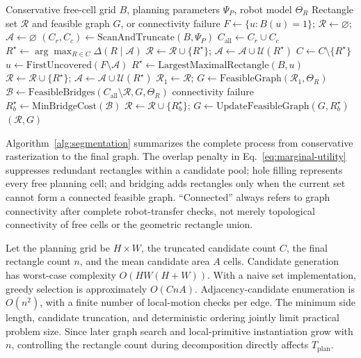 \begin{algorithm}[H]
\caption{Rectangle segmentation and connectivity completion}
\label{alg:segmentation}
\small
\begin{algorithmic}[1]
\Require Conservative free-cell grid $B$, planning parameters $\Psi_P$, robot model $\Theta_R$
\Ensure Rectangle set $\mathcal R$ and feasible graph $G$, or connectivity failure
\State $F\gets\{u:B(u)=1\}$; $\mathcal R\gets\varnothing$; $\mathcal A\gets\varnothing$
\State $(C_r,C_c)\gets\mathrm{ScanAndTruncate}(B,\Psi_P)$
\State $C_{\mathrm{all}}\gets C_r\cup C_c$
    \State $R^\star\gets\arg\max_{R\in C}\Delta(R\mid\mathcal A)$ 
    \State $\mathcal R\gets\mathcal R\cup\{R^\star\}$; $\mathcal A\gets\mathcal A\cup\mathcal U(R^\star)$
    \State $C\gets C\setminus\{R^\star\}$
  \EndWhile
\EndFor
{}
  \State $u\gets\mathrm{FirstUncovered}(F\setminus\mathcal A)$
  \State $R^\star\gets\mathrm{LargestMaximalRectangle}(B,u)$ 
  \State $\mathcal R\gets\mathcal R\cup\{R^\star\}$; $\mathcal A\gets\mathcal A\cup\mathcal U(R^\star)$
\EndWhile
\State $\mathcal R_1\gets\mathcal R$; $G\gets\mathrm{FeasibleGraph}(\mathcal R_1,\Theta_R)$
  \State $\mathcal B\gets\mathrm{FeasibleBridges}(C_{\mathrm{all}}\setminus\mathcal R,G,\Theta_R)$
    \State \Return connectivity failure
  \EndIf
  \State $R_b^\star\gets\mathrm{MinBridgeCost}(\mathcal B)$ 
  \State $\mathcal R\gets\mathcal R\cup\{R_b^\star\}$; $G\gets\mathrm{UpdateFeasibleGraph}(G,R_b^\star)$
\EndWhile
\State \Return $(\mathcal R,G)$
\end{algorithmic}
\end{algorithm}

Algorithm~\ref{alg:segmentation} summarizes the complete process from conservative rasterization to the final graph. The overlap penalty in Eq.~\eqref{eq:marginal-utility} suppresses redundant rectangles within a candidate pool; hole filling represents every free planning cell; and bridging adds rectangles only when the current set cannot form a connected feasible graph. ``Connected'' always refers to graph connectivity after complete robot-transfer checks, not merely topological connectivity of free cells or the geometric rectangle union.

Let the planning grid be $H\times W$, the truncated candidate count $C$, the final rectangle count $n$, and the mean candidate area $A$ cells. Candidate generation has worst-case complexity $O(HW(H+W))$. With a naive set implementation, greedy selection is approximately $O(CnA)$. Adjacency-candidate enumeration is $O(n^2)$, with a finite number of local-motion checks per edge. The minimum side length, candidate truncation, and deterministic ordering jointly limit practical problem size. Since later graph search and local-primitive instantiation grow with $n$, controlling the rectangle count during decomposition directly affects $T_{\mathrm{plan}}$.

